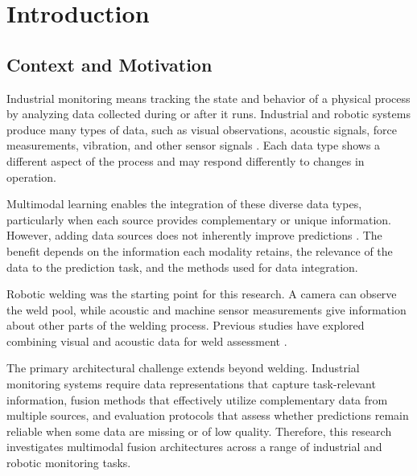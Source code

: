 
\chapter{Introduction}
\label{ch:introduction}



\section{Context and Motivation}

Industrial monitoring means tracking the state and behavior of a
physical process by analyzing data collected during or after it
runs. Industrial and robotic systems produce many types of data,
such as visual observations, acoustic signals, force measurements,
vibration, and other sensor signals
\citep{Huo2022Multisensor,Thoduka2024Handover}.
Each data type shows a different aspect of the process and may
respond differently to changes in operation.

Multimodal learning enables the integration of these diverse data
types, particularly when each source provides complementary or
unique information. However, adding data sources does not inherently
improve predictions \citep{Wang2020What}. The benefit depends on
the information each modality retains, the relevance of the data
to the prediction task, and the methods used for data integration.

Robotic welding was the starting point for this research. A camera
can observe the weld pool, while acoustic and machine sensor
measurements give information about other parts of the welding
process. Previous studies have explored combining visual and
acoustic data for weld assessment \citep{P003,Hua2026Weld}.

The primary architectural challenge extends beyond welding.
Industrial monitoring systems require data representations that
capture task-relevant information, fusion methods that effectively
utilize complementary data from multiple sources, and evaluation
protocols that assess whether predictions remain reliable when some
data are missing or of low quality. Therefore, this research
investigates multimodal fusion architectures across a range of
industrial and robotic monitoring tasks.


